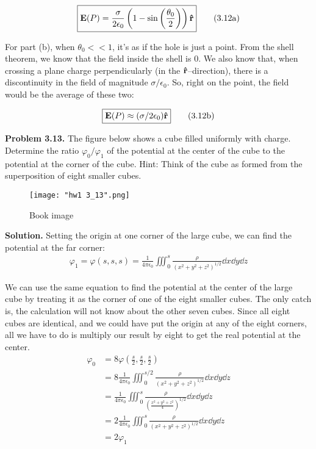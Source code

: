 \documentclass{article}
\begin{document}
\begin{equation}
	\boxed{\vb{E}(P) = \frac{\sigma}{2\epsilon_0}\left(1-\sin\left(\frac{\theta_0}{2}\right)\right)\vu{\vb{r}}}\tag{3.12a}\label{eq:3.12a}
\end{equation}

For part (b), when $\theta _0 <\!\!< 1$, it's as if the hole is just a point. From the shell theorem, we know that the field inside the shell is 0. We also know that, when crossing a plane charge perpendicularly (in the $\vu{\vb{r}}$--direction), there is a discontinuity in the field of magnitude $\sigma/\epsilon_0$. So, right on the point, the field would be the average of these two: 

\begin{equation}
	\boxed{\vb{E}(P) \approx (\sigma/2\epsilon _0)\vu{\vb{r}}}\tag{3.12b}\label{eq:3.12b}
\end{equation}
 
\hrulefill

\textbf{Problem 3.13.} The figure below shows a cube filled uniformly with charge. Determine the ratio $\varphi _0/\varphi _1$ of the potential at the center of the cube to the potential at the corner of the cube. Hint: Think of the cube as formed from the superposition of eight smaller cubes.

\begin{figure}[H]%
\centering
\texttt{[image: "hw1 3\_13".png]}
\caption{Book image}
\end{figure}

\textbf{Solution.} Setting the origin at one corner of the large cube, we can find the potential at the far corner:
\[
\begin{aligned}
	\varphi_1 = \varphi(s,s,s) = \frac{1}{4\pi\epsilon_0}\iiint_0^s \frac{\rho}{(x^2+y^2+z^2)^{1/2}}\dd{x}\dd{y}\dd{z}
\end{aligned}
\]

We can use the same equation to find the potential at the center of the large cube by treating it as the corner of one of the eight smaller cubes. The only catch is, the calculation will not know about the other seven cubes. Since all eight cubes are identical, and we could have put the origin at any of the eight corners, all we have to do is multiply our result by eight to get the real potential at the center.
\[
\begin{aligned}
	\varphi_0 &= 8\varphi\left(\frac{s}{2},\frac{s}{2},\frac{s}{2}\right) \\
	&= 8\frac{1}{4\pi\epsilon_0}\iiint_0^{s/2} \frac{\rho}{(x^2+y^2+z^2)^{1/2}}\dd{x}\dd{y}\dd{z} \\
	&= \frac{1}{4\pi\epsilon_0}\iiint_0^{s} \frac{\rho}{(\frac{x^2+y^2+z^2}{4})^{1/2}}\dd{x}\dd{y}\dd{z} \\
	&= 2\frac{1}{4\pi\epsilon_0}\iiint_0^s \frac{\rho}{(x^2+y^2+z^2)^{1/2}}\dd{x}\dd{y}\dd{z} \\
	&= 2\varphi_1
\end{aligned}
\]
\end{document}
